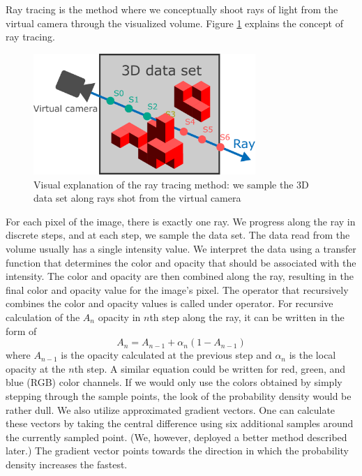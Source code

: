 Ray tracing is the method where we conceptually shoot rays of light from the virtual camera through the visualized volume.
Figure \ref{fig:ray_tracing_method} explains the concept of ray tracing.
\begin{figure}
	\centering
	\includegraphics[width=0.75\textwidth]{figures/ray_tracing_visualization.pdf}
	\caption{Visual explanation of the ray tracing method: we sample the 3D data set along rays shot from the virtual camera}
	\label{fig:ray_tracing_method}
\end{figure}
For each pixel of the image, there is exactly one ray.
We progress along the ray in discrete steps, and at each step, we sample the data set.
The data read from the volume usually has a single intensity value.
We interpret the data using a transfer function that determines the color and opacity that should be associated with the intensity.
The color and opacity are then combined along the ray, resulting in the final color and opacity value for the image's pixel.
The operator that recursively combines the color and opacity values is called under operator. For recursive calculation of the $A_n$ opacity in $n$th step along the ray, it can be written in the form of
\begin{equation}
	\label{eq:under_op}
	A_n = A_{n-1} + \alpha_n(1 - A_{n-1})
\end{equation}
where $A_{n-1}$ is the opacity calculated at the previous step and $\alpha_n$ is the local opacity at the $n$th step.
A similar equation could be written for red, green, and blue (RGB) color channels.
If we would only use the colors obtained by simply stepping through the sample points, the look of the probability density would be rather dull.
We also utilize approximated gradient vectors.
One can calculate these vectors by taking the central difference using six additional samples around the currently sampled point.
(We, however, deployed a better method described later.)
The gradient vector points towards the direction in which the probability density increases the fastest.
